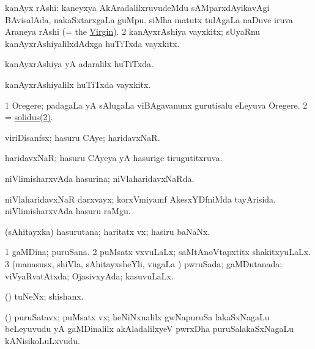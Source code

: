 \bentry
{} 
\gl{\nA}
\bmng
\bnum
{} kanAyx rAshi: 
\banum
{} kaneyxya AkAradalilxruvudeMdu sAMparxdAyikavAgi BAvisalAda, nakaSxtarxgaLa guMpu. 
 siMha matutx tulAgaLa naDuve iruva Araneya rAshi (= the \hyperlink{virgin(2)}{Virgin}). 
\eanum
\numie
\num{2} kanAyxrAshiya vayxkitx; sUyaRnu kanAyxrAshiyalilxdAdxga huTiTxda vayxkitx. 
\enum
\emng
\eentry

\bentry
{} 
\gl{\gu}
\expl{}
\bmng
 kanAyxrAshiya yA adaralilx huTiTxda. 
\emng
\eentry

\bentry
{} 
\gl{\nA}
\expl{}
\bmng
 kanAyxrAshiyalilx huTiTxda vayxkitx. 
\emng
\eentry

\bentry
{} 
\gl{\nA}
\expl{}
\bmng
\bnum
\num{1} Oregere; padagaLa yA sAlugaLa viBAgavanunx gurutisalu eLeyuva Oregere. 
\num{2} = \hyperref{kandict_s.pdf}{S}{solidus(2)}{solidus(2)}. 
\enum
\emng
\eentry

\bentry
{} 
\gl{\nA}
\expl{}
\bmng
 viriDisanfsx; hasuru CAye; haridavxNaR. 
\emng
\eentry

\bentry
{} 
\gl{\gu}
\expl{}
\bmng
 haridavxNaR; hasuru CAyeya yA hasurige tirugutitxruva. 
\emng
\eentry

\bentry 
{} 
\gl{\gu}
\expl{}
\bmng
 niVlimisharxvAda hasurina; niVlaharidavxNaRda. 
\emng
\eentry

\bentry
{} 
\gl{\nA}
\expl{}
\bmng
 niVlaharidavxNaR darxvayx; korxVmiyamf AkesxYDfniMda tayArisida, niVlimisharxvAda hasuru raMgu. 
\emng
\eentry

\bentry 
{} 
\gl{\nA}
\expl{}
\bmng
 (sAhitayxka) hasurutana; haritatx vx; hasiru baNaNx. 
\emng
\eentry

\bentry
{} 
\gl{\gu}
\expl{}
\bmng
\bnum
\num{1} gaMDina; puruSana. 
\num{2} puMsatx vxvuLaLx; saMtAnoVtapxtitx shakitxyuLaLx. 
\num{3} (manasusx, shiVla, sAhitayxsheYli, \mo vugaLa \vi) pwruSada; gaMDutanada; viVyaRvatAtxda; OjasivxyAda; kasuvuLaLx. 
\enum
\emng
\eentry

\bentry 
{}
\gl{\nA}
\expl{}
\bmng
 (\pArxparx) tuNeNx; shishanx. 
\emng
\eentry

\bentry
{} 
\gl{\nA}
\expl{}
\bmng
 (\veYshA) puruSatavx; puMsatx vx; heNiNxnalilx gwNapuruSa lakaSxNagaLu beLeyuvudu yA gaMDinalilx akAladalilxyeV pwrxDha puruSalakaSxNagaLu kANisikoLuLxvudu. 
\emng
\eentry


